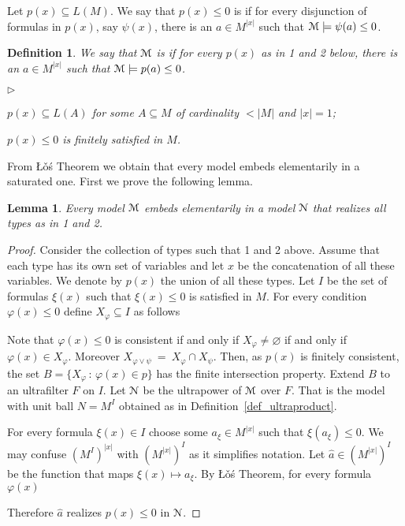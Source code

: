 \documentclass[12pt,letterpaper,oneside,reqno]{amsart}
\newcommand{\mylabel}[1]{{#1}\hfill}
\renewenvironment{itemize}
  {\begin{list}{$\triangleright$}{%
   \setlength{\parskip}{0mm}
   \setlength{\topsep}{.2\baselineskip}
   \setlength{\rightmargin}{0mm}
   \setlength{\listparindent}{0mm}
   \setlength{\itemindent}{0mm}
   \setlength{\labelwidth}{3ex}
   \setlength{\itemsep}{.2\baselineskip}
   \setlength{\parsep}{.2\baselineskip}
   \setlength{\partopsep}{0mm}
   \setlength{\labelsep}{1ex}
   \setlength{\leftmargin}{\labelwidth+\labelsep}
   \let\makelabel\mylabel}}{%
   \end{list}}
\theoremstyle{plain}
\newtheorem{lemma}[theorem]{Lemma}
\newtheorem{definition}[theorem]{Definition}
\theoremstyle{remark}
\renewcommand*{\emph}[1]{%
   \smash{\tikz[baseline]\node[rectangle, fill=olive!25, rounded corners, inner xsep=0.5ex, inner ysep=0.2ex, anchor=base, minimum height = 2.7ex]{#1};}}
\begin{document}
Let $p(x)\subseteq L(M)$.
We say that $p(x)\le 0$ is \emph{finitely satisfied in ${\EuScript M}$\/} if for every disjunction of formulas in $p(x)$, say $\psi(x)$, there is an $a\in M^{|x|}$ such that ${\EuScript M}\models\psi(a)\le0$.

\begin{definition}
  We say that ${\EuScript M}$ is \emph{saturated\/} if for every $p(x)$ as in 1 and 2 below, there is an $a\in M^{|x|}$ such that ${\EuScript M}\models p(a)\le0$.
  \begin{itemize}
    \item[1.] $p(x)\subseteq L(A)$ for some $A\subseteq M$ of cardinality $<|M|$ and $|x|=1$;
    \item[2.] $p(x)\le0$ is finitely satisfied in $M$.
  \end{itemize}
\end{definition}

From \L\v{o}\'s Theorem we obtain that every model embeds elementarily in a saturated one.
First we prove the following lemma.

\begin{lemma}\label{thm_compattezza}
  Every model ${\EuScript M}$ embeds elementarily in a model ${\EuScript N}$ that realizes all types as in 1 and 2.
\end{lemma}

\begin{proof}
  Consider the collection of types such that 1 and 2 above.
  Assume that each type has its own set of variables and let $x$ be the concatenation of all these variables.
  We denote by $p(x)$ the union of all these types.
  Let $I$ be the set of formulas $\xi(x)$ such that $\xi(x)\le0$ is satisfied in $M$.
  For every condition $\varphi(x)\le0$ define $X_\varphi\subseteq I$ as follows


  Note that $\varphi(x)\le0$ is consistent if and only if $X_\varphi\neq\varnothing$ if and only if $\varphi(x)\in X_{\varphi}$.
  Moreover $X_{\varphi\vee\psi}\ =\ X_\varphi\cap X_\psi$. Then, as $p(x)$  is finitely consistent, the set $B=\big\{X_\varphi\,:\,\varphi(x)\in p\big\}$ has the finite intersection property.
  Extend $B$ to an ultrafilter $F$ on $I$.
  Let ${\EuScript N}$ be the ultrapower of ${\EuScript M}$ over $F$.
  That is the model with unit ball $N=M^I$ obtained as in Definition~\ref{def_ultraproduct}.

  For every formula $\xi(x)\in I$ choose some $a_\xi\in M^{|x|}$ such that $\xi(a_\xi)\le0$.
  We may confuse $(M^I)^{|x|}$ with $(M^{|x|})^I$ as it simplifies notation.
  Let $\hat a\in (M^{|x|})^I$ be the function that maps $\xi(x)\mapsto a_\xi$.
  By \L\v o\'s Theorem, for every formula $\varphi(x)$


  Therefore $\hat a$ realizes $p(x)\le0$ in ${\EuScript N}$.
\end{proof}
\end{document}
